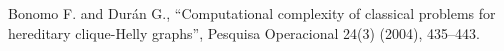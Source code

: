 \item Bonomo F. and Dur\'an G., ``Computational complexity of
classical problems for hereditary clique-Helly graphs'', Pesquisa
Operacional 24(3) (2004), 435--443.
